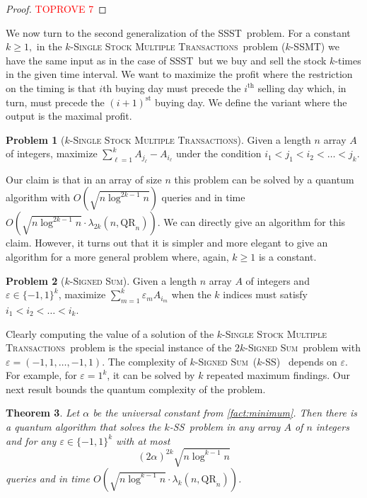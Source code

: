 \documentclass[12pt]{article}
\newcommand{\qr}{\mathrm{QR}}
\newcommand{\SSST}{\textsc{SSST}}
\newcommand{\SSMTf}{\textsc{Single Stock Multiple Transactions}}
\newcommand{\SSMT}{\textsc{SSMT}}
\newcommand{\SiSf}{\textsc{Signed Sum}}
\newcommand{\SiS}{\textsc{SS}}
\newtheorem{theorem}{Theorem}
\theoremstyle{definition}
\newtheorem{problem}[theorem]{Problem}
\begin{document}
\begin{proof}\textcolor{red}{TOPROVE 7}\end{proof}

We now turn to the second generalization of the \SSST \ problem.
For a constant $k \geq 1,$ in the $k$-\SSMTf \ problem ($k$-\SSMT) we have the same input as in the case of  \SSST \ but we buy and sell the stock $k$-times in the given time interval. 
We want to maximize the profit where the restriction on the timing is that $i$th  buying day must precede the $i^\text{th}$ selling day which, in turn, must precede the $(i+1)^\text{st}$ buying day.
We define the variant where the output is the maximal profit.

\begin{problem}[$k$-\SSMTf] 
Given a length $n$ array $A$ of integers, maximize $\sum_{\ell =1}^k A_{j_{\ell}} - A_{i_{\ell}}$ under the condition $i_1 < j_1 < i_2< \ldots < j_k$.
\end{problem}

Our claim is that in an array of size $n$ this problem can be solved by a quantum algorithm with $O(\sqrt{n \log^{2k-1} n})$
queries and in time $O(\sqrt{n \log^{2k - 1} n} \cdot \lambda_{2k} (n, \qr_n))$. 
We can directly give an algorithm for this claim. However, it turns out that it is simpler and more elegant to give an algorithm for a more general problem where, again, $k \geq 1$ is a constant.

\begin{problem}[$k$-\SiSf] 
Given a length $n$ array $A$ of integers and $\varepsilon \in \{-1,1\}^k$, maximize $\sum_{m =1}^k  \varepsilon_m A_{i_m}$ when the $k$ indices must satisfy
$i_1  < i_2< \ldots < i_k$. 
\end{problem}

Clearly computing the value of a solution of the $k$-\SSMTf \ problem is the special instance of the $2k$-\SiSf \ problem with $\varepsilon = (-1,1, \ldots, -1,1)$.
The complexity of $k$-\SiSf\ ($k$-\SiS) \ depends on $\varepsilon$. For example, for $\varepsilon = 1^k$, it can be solved by
$k$ repeated maximum findings. Our next result bounds the quantum complexity of the problem.

\begin{theorem}
\label{thm:k-sis}
Let $\alpha$ be the universal constant from \cref{fact:minimum}. 
Then there is a quantum algorithm that solves the $k$-\SiS \ problem in any array $A$ of $n$ integers and for any $\varepsilon \in \{-1,1\}^k$ with at most $$(2\alpha)^{2k} \sqrt{n \log^{k-1} n}$$ queries and in time $O(\sqrt{n \log^{k-1} n} \cdot \lambda_k(n,\qr_n))$.
\end{theorem}
\end{document}
